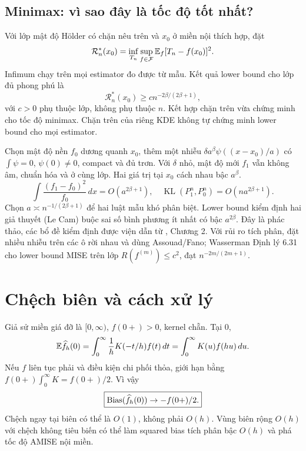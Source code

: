 \subsection{Minimax: vì sao đây là tốc độ tốt nhất?}
Với lớp mật độ Hölder có chặn nêu trên và $x_0$ ở miền nội thích hợp,
đặt
\[
\mathcal R_n^*(x_0)=\inf_{T_n}\sup_{f\in\mathcal F}
\mathbb E_f[T_n-f(x_0)]^2.
\]
Infimum chạy trên mọi estimator đo được từ mẫu. Kết quả lower bound
cho lớp đủ phong phú là
\[
\mathcal R_n^*(x_0)\geq c n^{-2\beta/(2\beta+1)},
\]
với $c>0$ phụ thuộc lớp, không phụ thuộc $n$. Kết hợp chặn trên vừa chứng
minh cho tốc độ minimax. Chặn trên của riêng KDE không tự chứng minh
lower bound cho mọi estimator.

Chọn mật độ nền $f_0$ dương quanh $x_0$, thêm một nhiễu
$\delta a^\beta\psi((x-x_0)/a)$ có $\int\psi=0$, $\psi(0)\ne0$,
compact và đủ trơn. Với $\delta$ nhỏ, mật độ mới $f_1$ vẫn không âm,
chuẩn hóa và ở cùng lớp. Hai giá trị tại $x_0$ cách nhau bậc $a^\beta$.
\[
\int\frac{(f_1-f_0)^2}{f_0}\,dx=O(a^{2\beta+1}),
\quad
\operatorname{KL}(P_1^n,P_0^n)=O(na^{2\beta+1}).
\]
Chọn $a\asymp n^{-1/(2\beta+1)}$ để hai luật mẫu khó phân biệt.
Lower bound kiểm định hai giả thuyết (Le Cam) buộc sai số bình phương
ít nhất có bậc $a^{2\beta}$. Đây là phác thảo, các bổ đề kiểm định được
viện dẫn từ \cite{tsybakov}, Chương 2.
Với rủi ro tích phân, đặt nhiều nhiễu trên các ô rời nhau và dùng
Assouad/Fano; Wasserman Định lý 6.31 cho lower bound MISE trên lớp
$R(f^{(m)})\leq c^2$, đạt $n^{-2m/(2m+1)}$.

\section{Chệch biên và cách xử lý}
Giả sử miền giá đỡ là $[0,\infty)$, $f(0+)>0$, kernel chẵn. Tại 0,
\[
\mathbb E\widehat f_h(0)=\int_0^\infty\frac1hK(-t/h)f(t)\,dt
=\int_0^\infty K(u)f(hu)\,du.
\]
Nếu $f$ liên tục phải và điều kiện chi phối thỏa,
giới hạn bằng $f(0+)\int_0^\infty K=f(0+)/2$. Vì vậy
\[
\boxed{\operatorname{Bias}(\widehat f_h(0))\to-f(0+)/2.}
\]
Chệch ngay tại biên có thể là $O(1)$, không phải $O(h)$.
Vùng biên rộng $O(h)$ với chệch không tiêu biến có thể làm squared bias
tích phân bậc $O(h)$ và phá tốc độ AMISE nội miền.

